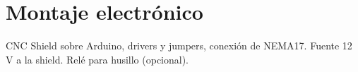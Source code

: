 \chapter{Montaje electrónico}
\label{ch:electronic}
CNC Shield sobre Arduino, drivers y jumpers, conexión de NEMA17. Fuente 12 V a la shield. Relé para husillo (opcional).

